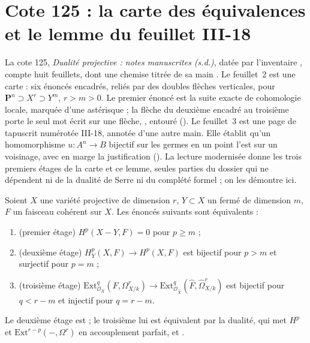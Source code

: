 \section[Cote 125 : la carte des équivalences et le lemme du feuillet III-18]{Cote 125 : la carte des équivalences et le lemme du feuillet III-18\protect{}}\label{sec:125}

La cote 125, \emph{Dualité projective : notes manuscrites (s.d.)}, datée par l'inventaire \q{[avant 1970]}, compte huit feuillets, dont une chemise titrée de sa main . Le feuillet~2 est une carte : six énoncés encadrés, reliés par des doubles flèches verticales, pour $\mathbf P^n \supset X^r \supset Y^m$, $r > m > 0$. Le premier énoncé est la suite exacte de cohomologie locale, marquée d'une astérisque ; la flèche du deuxième encadré au troisième porte le seul mot écrit sur une flèche, , entouré (). Le feuillet~3 est une page de tapuscrit numérotée III-18, annotée d'une autre main. Elle établit qu'un homomorphisme $u : A^n \to B$ bijectif sur les germes en un point l'est sur un voisinage, avec en marge la justification  (). La lecture modernisée donne les trois premiers étages de la carte et ce lemme, seules parties du dossier qui ne dépendent ni de la dualité de Serre ni du complété formel ; on les démontre ici.

\begin{enonce}
Soient $X$ une variété projective de dimension $r$, $Y \subset X$ un fermé de dimension $m$, $F$ un faisceau cohérent sur $X$. Les énoncés suivants sont équivalents :
\begin{enumerate}
\item (premier étage) $H^p(X - Y, F) = 0$ pour $p \geqslant m$ ;
\item (deuxième étage) $H^p_Y(X, F) \to H^p(X, F)$ est bijectif pour $p > m$ et surjectif pour $p = m$ ;
\item (troisième étage) $\mathrm{Ext}^q_{\mathcal O_X}(F, \Omega^r_{X/k}) \to \mathrm{Ext}^q_{\mathcal O_{\widehat X}}(\widehat F, \widehat\Omega^r_{X/k})$ est bijectif pour $q < r - m$ et injectif pour $q = r - m$.
\end{enumerate}
Le deuxième étage est  ; le troisième lui est équivalent par la dualité, qui met $H^p$ et $\mathrm{Ext}^{r-p}(-, \Omega^r)$ en accouplement parfait, et .
\end{enonce}

